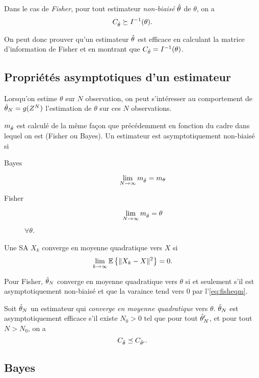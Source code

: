\begin{myineg}
  Dans le cas de \emph{Fisher},
  pour tout estimateur \emph{non-biaisé} $\hat{\theta}$ de $\theta$,
  on a
  \[ C_{\hat{\theta}} \succeq I^{-1}(\theta). \]
\end{myineg}

On peut donc prouver qu'un estimateur $\hat{\theta}$ est efficace en calculant
la matrice d'information de Fisher
et en montrant que $C_{\hat{\theta}} = I^{-1}(\theta)$.

\subsection{Propriétés asymptotiques d'un estimateur}
Lorsqu'on estime $\theta$ sur $N$ observation,
on peut s'intéresser au comportement de $\hat{\theta}_N = g(Z^N)$ l'estimation
de $\theta$ sur ces $N$ observations.
\begin{mydef}
  $m_{\hat{\theta}}$ est calculé de la même façon que précédemment
  en fonction du cadre dans lequel on est (Fisher ou Bayes).
  Un estimateur est asymptotiquement non-biaisé si
  \begin{description}
    \item[Bayes]
      \[ \lim_{N\to\infty} m_{\hat{\theta}} = m_\theta \]
    \item[Fisher]
      \[ \lim_{N\to\infty} m_{\hat{\theta}} = \theta \]
      $\forall \theta$.
  \end{description}
\end{mydef}
\begin{mydef}
  Une SA $X_k$ converge en moyenne quadratique vers $X$ si
  \[ \lim_{k\to\infty} \mathbb{E}\left\{\|X_k-X\|^2\right\} = 0. \]
\end{mydef}
Pour Fisher,
$\hat{\theta}_N$ converge en moyenne quadratique vers $\theta$ si
et seulement s'il est asymptotiquement non-biaisé et que la varaince tend
vers 0 par l'\eqref{eq:fisheqm}.

\begin{mydef}
  Soit $\hat{\theta}_N$ un estimateur qui \emph{converge en moyenne quadratique} vers $\theta$.
  $\hat{\theta}_N$ est asymptotiquement efficace s'il existe $N_0 > 0$ tel que
  pour tout $\hat{\theta}'_N$, et pour tout $N > N_0$, on a
  \[ C_{\hat{\theta}} \preceq C_{\hat{\theta}'}. \]
\end{mydef}

\subsection{Bayes}
